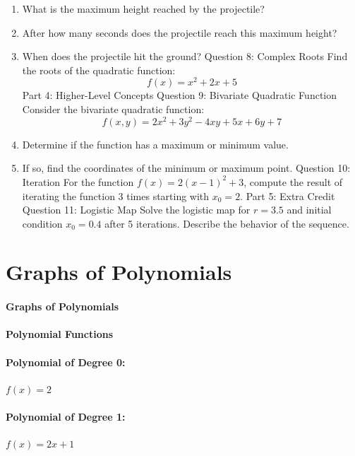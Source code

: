 \begin{enumerate}
    \item What is the maximum height reached by the projectile?
    \item After how many seconds does the projectile reach this maximum height?
    \item When does the projectile hit the ground? Question 8: Complex Roots Find the roots of the quadratic function: $$ f(x) = x^2 + 2x + 5 $$ Part 4: Higher-Level Concepts Question 9: Bivariate Quadratic Function Consider the bivariate quadratic function: $$ f(x, y) = 2x^2 + 3y^2 - 4xy + 5x + 6y + 7 $$
    \item Determine if the function has a maximum or minimum value.
    \item If so, find the coordinates of the minimum or maximum point. Question 10: Iteration For the function $ f(x) = 2(x - 1)^2 + 3 $, compute the result of iterating the function 3 times starting with $ x_0 = 2 $. Part 5: Extra Credit Question 11: Logistic Map Solve the logistic map for $ r = 3.5 $ and initial condition $ x_0 = 0.4 $ after 5 iterations. Describe the behavior of the sequence.
\end{enumerate}

\section{Graphs of Polynomials}
\label{sec:graphs-of-polynomials}

\paragraph{Graphs of Polynomials}

\paragraph{Polynomial Functions}

\paragraph{Polynomial of Degree 0:}
$
f(x) = 2
$

\paragraph{Polynomial of Degree 1:}
$
f(x) = 2x + 1
$

